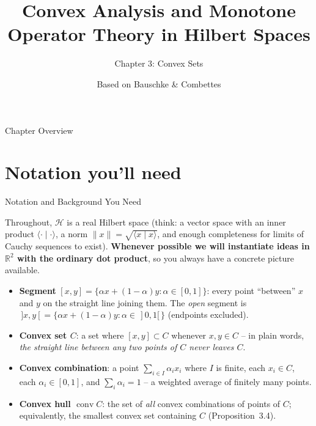 \documentclass[aspectratio=169,10pt]{beamer}
\title[Convex Analysis \& MOT -- Ch.3]{Convex Analysis and Monotone Operator Theory in Hilbert Spaces}
\subtitle{Chapter 3: Convex Sets}
\author{Based on Bauschke \& Combettes}
\institute{CMS Books in Mathematics, Springer, 2017 (2nd ed.)}
\date{}
\newcommand{\Hil}{\mathcal{H}}
\newcommand{\R}{\mathbb{R}}
\newcommand{\conv}{\operatorname{conv}}
\newcommand{\ip}[2]{\langle #1 \mid #2 \rangle}
\newcommand{\norm}[1]{\lVert #1 \rVert}
\begin{document}

\begin{frame}
  \titlepage
\end{frame}

\begin{frame}{Chapter Overview}
  \tableofcontents
\end{frame}

\section{Notation you'll need}

\begin{frame}[allowframebreaks]{Notation and Background You Need}

Throughout, $\Hil$ is a real Hilbert space (think: a vector space with an
inner product $\ip{\cdot}{\cdot}$, a norm $\norm{x}=\sqrt{\ip{x}{x}}$, and
enough completeness for limits of Cauchy sequences to exist). \textbf{Whenever
possible we will instantiate ideas in $\R^2$ with the ordinary dot product},
so you always have a concrete picture available.

\begin{itemize}
  \item \textbf{Segment} $[x,y] = \{\alpha x + (1-\alpha)y : \alpha \in [0,1]\}$:
    every point ``between'' $x$ and $y$ on the straight line joining them.
    The \emph{open} segment is $\,]x,y[ = \{\alpha x+(1-\alpha)y: \alpha\in\,]0,1[\,\}$
    (endpoints excluded).
  \item \textbf{Convex set $C$}: a set where $[x,y]\subset C$ whenever
    $x,y\in C$ -- in plain words, \emph{the straight line between any two
    points of $C$ never leaves $C$}.
  \item \textbf{Convex combination}: a point $\sum_{i\in I}\alpha_i x_i$
    where $I$ is finite, each $x_i\in C$, each $\alpha_i\in[0,1]$, and
    $\sum_i \alpha_i = 1$ -- a weighted average of finitely many points.
  \item \textbf{Convex hull $\conv C$}: the set of \emph{all} convex
    combinations of points of $C$; equivalently, the smallest convex set
    containing $C$ (Proposition~3.4).

\framebreak


\end{itemize}
\end{frame}
\end{document}
